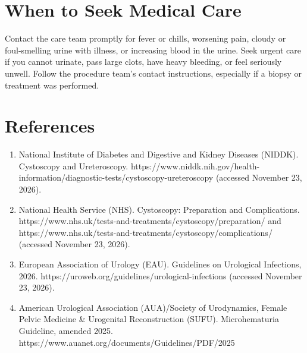 \section*{When to Seek Medical Care}
Contact the care team promptly for fever or chills, worsening pain, cloudy or foul-smelling urine with illness, or increasing blood in the urine. Seek urgent care if you cannot urinate, pass large clots, have heavy bleeding, or feel seriously unwell. Follow the procedure team's contact instructions, especially if a biopsy or treatment was performed.

\section*{References}
\begin{enumerate}
  \item National Institute of Diabetes and Digestive and Kidney Diseases (NIDDK). Cystoscopy and Ureteroscopy. https://www.niddk.nih.gov/health-information/diagnostic-tests/cystoscopy-ureteroscopy (accessed November 23, 2026).
  \item National Health Service (NHS). Cystoscopy: Preparation and Complications. https://www.nhs.uk/tests-and-treatments/cystoscopy/preparation/ and https://www.nhs.uk/tests-and-treatments/cystoscopy/complications/ (accessed November 23, 2026).
  \item European Association of Urology (EAU). Guidelines on Urological Infections, 2026. https://uroweb.org/guidelines/urological-infections (accessed November 23, 2026).
  \item American Urological Association (AUA)/Society of Urodynamics, Female Pelvic Medicine \& Urogenital Reconstruction (SUFU). Microhematuria Guideline, amended 2025. https://www.auanet.org/documents/Guidelines/PDF/2025%
\end{enumerate}
\clearpage
